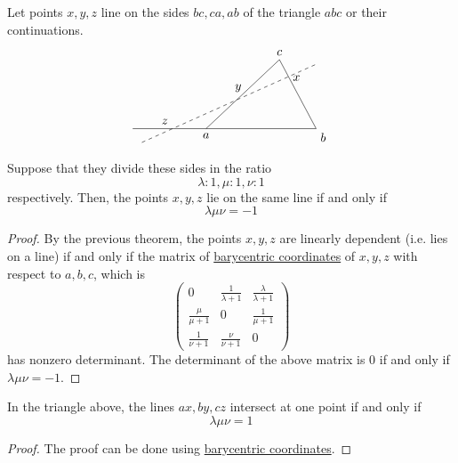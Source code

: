   \begin{corollary}
    \label{thm:menelaus-theorem}
    Let points $x, y, z$ line on the sides $bc, ca, ab$ of the triangle $abc$ or their continuations. 
    \begin{equation}
      \begin{tikzpicture}[scale=1.3]
            \draw (-1,0)--(3,0)--(2.2, 1.5)--(0.6,0);
            \node[below] at (0.6, 0) {$a$};
            \node[below right] at (3,0) {$b$};
            \node[above] at (2.2, 1.5) {$c$};
            \draw[dashed] (-0.8,-0.3)--(3,1.4);
            \node[above] at (-0.3, 0) {$z$};
            \node[above] at (1.3, 0.7) {$y$};
            \node[right] at (2.4, 1.1) {$x$};
          \end{tikzpicture}
    \end{equation}
    Suppose that they divide these sides in the ratio 
    \begin{equation}
      \lambda: 1, \mu: 1, \nu: 1
    \end{equation}
    respectively. Then, the points $x, y, z$ lie on the same line if and only if 
    \begin{equation}
      \lambda \mu \nu = -1
    \end{equation}
  \end{corollary}
  \begin{proof}
  By the previous theorem, the points $x, y, z$ are linearly dependent (i.e. lies on a line) if and only if the matrix of \hyperref[def:barycentric-coordinates]{barycentric coordinates} of $x, y, z$ with respect to $a, b, c$, which is
  \begin{equation}
    \begin{pmatrix}
    0 & \frac{1}{\lambda + 1} & \frac{\lambda}{\lambda + 1} \\
    \frac{\mu}{\mu + 1} & 0 & \frac{1}{\mu + 1} \\
    \frac{1}{\nu + 1} & \frac{\nu}{\nu+1} & 0
    \end{pmatrix}
  \end{equation}
  has nonzero determinant. The determinant of the above matrix is $0$ if and only if $\lambda \mu \nu = -1$. 
  \end{proof}

  \begin{corollary}
    \label{thm:cevas-theorem}
    In the triangle above, the lines $ax, by, cz$ intersect at one point if and only if 
    \begin{equation}
      \lambda \mu \nu = 1
    \end{equation}
  \end{corollary}
  \begin{proof}
    The proof can be done using \hyperref[def:barycentric-coordinates]{barycentric coordinates}. 
  \end{proof}

